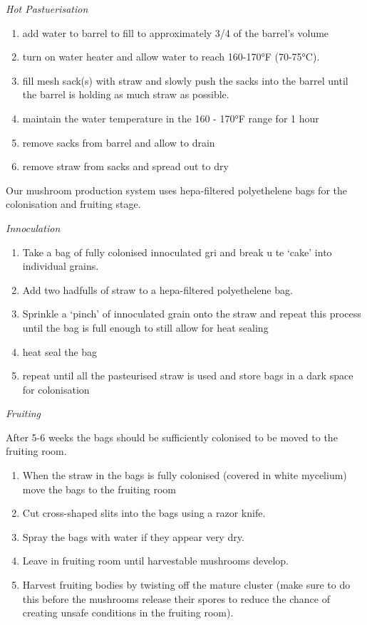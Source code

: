 \emph{Hot Pastuerisation}

\begin{enumerate}
\def\labelenumi{\arabic{enumi}.}
\itemsep1pt\parskip0pt
\item
  add water to barrel to fill to approximately 3/4 of the barrel's
  volume
\item
  turn on water heater and allow water to reach 160-170°F (70-75°C).
\item
  fill mesh sack(s) with straw and slowly push the sacks into the barrel
  until the barrel is holding as much straw as possible.
\item
  maintain the water temperature in the 160 - 170°F range for 1 hour
\item
  remove sacks from barrel and allow to drain
\item
  remove straw from sacks and spread out to dry
\end{enumerate}

Our mushroom production system uses hepa-filtered polyethelene bags for
the colonisation and fruiting stage.

\emph{Innoculation}

\begin{enumerate}
\def\labelenumi{\arabic{enumi}.}
\itemsep1pt\parskip0pt
\item
  Take a bag of fully colonised innoculated gri and break u te `cake'
  into individual grains.
\item
  Add two hadfulls of straw to a hepa-filtered polyethelene bag.
\item
  Sprinkle a `pinch' of innoculated grain onto the straw and repeat this
  process until the bag is full enough to still allow for heat sealing
\item
  heat seal the bag
\item
  repeat until all the pasteurised straw is used and store bags in a
  dark space for colonisation
\end{enumerate}

\emph{Fruiting}

After 5-6 weeks the bags should be sufficiently colonised to be moved to
the fruiting room.

\begin{enumerate}
\def\labelenumi{\arabic{enumi}.}
\itemsep1pt\parskip0pt
\item
  When the straw in the bags is fully colonised (covered in white
  mycelium) move the bags to the fruiting room
\item
  Cut cross-shaped slits into the bags using a razor knife.
\item
  Spray the bags with water if they appear very dry.
\item
  Leave in fruiting room until harvestable mushrooms develop.
\item
  Harvest fruiting bodies by twisting off the mature cluster (make sure
  to do this before the mushrooms release their spores to reduce the
  chance of creating unsafe conditions in the fruiting room).
\end{enumerate}

